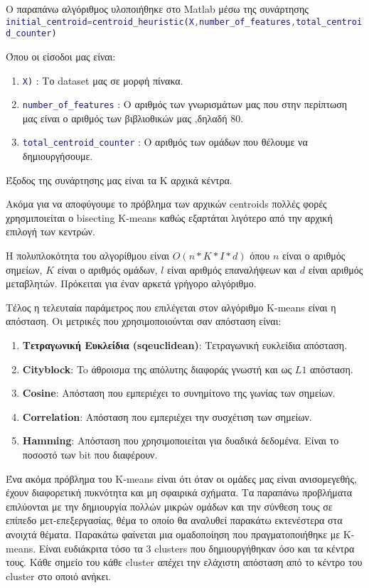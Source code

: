 Ο παραπάνω αλγόριθμος υλοποιήθηκε στο Matlab μέσω της συνάρτησης
\lstinline[language=MATLAB]!initial_centroid=centroid_heuristic(X,number_of_features,total_centroid_counter)!

Όπου οι είσοδοι μας είναι:
\begin{enumerate}
    \item \lstinline[language=MATLAB]!X)! : Το dataset μας σε μορφή πίνακα.
    \item \lstinline[language=MATLAB]!number_of_features! : Ο αριθμός των γνωρισμάτων μας που στην περίπτωση μας είναι ο αριθμός των βιβλιοθικών μας ,δηλαδή 80.
    \item \lstinline[language=MATLAB]!total_centroid_counter! : Ο αριθμός των ομάδων που θέλουμε να δημιουργήσουμε.
\end{enumerate}

Έξοδος της συνάρτησης μας είναι τα Κ αρχικά κέντρα.


Ακόμα για να αποφύγουμε το πρόβλημα των αρχικών centroids πολλές φορές χρησμιποιείται ο bisecting K-means καθώς εξαρτάται λιγότερο από την αρχική επιλογή των κεντρών.

Η πολυπλοκότητα του αλγορίθμου είναι $ O(n*K*I*d)$ όπου $n$ είναι ο αριθμός σημείων, $Κ$ είναι ο αριθμός ομάδων, $l$ είναι αριθμός επαναλήψεων και $d$ είναι αριθμός μεταβλητών. Πρόκειται για έναν αρκετά γρήγορο αλγόριθμο.

Τέλος η τελευταία παράμετρος που επιλέγεται στον αλγόριθμο K-means είναι η απόσταση. Οι μετρικές που χρησιμοποιούνται σαν απόσταση είναι:
\begin{enumerate}
    \item \textbf{Τετραγωνική Ευκλείδια (sqeuclidean)}: Τετραγωνική ευκλείδια απόσταση.
    \item \textbf{Cityblock}: To άθροισμα της απόλυτης διαφοράς γνωστή και ως $L1$ απόσταση.
    \item \textbf{Cosine}: Απόσταση που εμπεριέχει το συνημίτονο της γωνίας των σημείων.
    \item \textbf{Correlation}: Απόσταση που εμπεριέχει την συσχέτιση των σημείων.
    \item \textbf{Hamming}: Απόσταση που χρησιμοποιείται για δυαδικά δεδομένα. Είναι το ποσοστό των bit που διαφέρουν.
\end{enumerate}

Ένα ακόμα πρόβλημα του K-means είναι ότι όταν οι ομάδες μας είναι ανισομεγεθής, έχουν διαφορετική πυκνότητα και μη σφαιρικά σχήματα. Τα παραπάνω προβλήματα επιλύονται με την δημιουργία πολλών μικρών ομάδων και την σύνθεση τους σε επίπεδο μετ-επεξεργασίας, θέμα το οποίο θα αναλυθεί παρακάτω εκτενέστερα στα ανοιχτά θέματα.
Παρακάτω φαίνεται μια ομαδοποίηση που πραγματοποιήθηκε με K-means. Είναι ευδιάκριτα τόσο τα 3 clusters που δημιουργήθηκαν όσο και τα κέντρα τους. Κάθε σημείο του κάθε cluster απέχει την ελάχιστη απόσταση από το κέντρο του cluster στο οποιό ανήκει.

